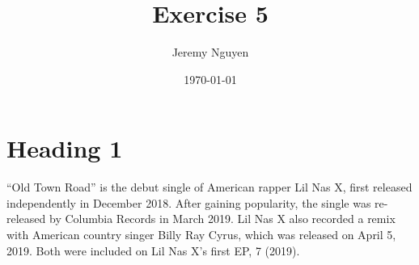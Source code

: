 \documentclass[11pt]{article}
\begin{document}
\title{Exercise 5}
\author{Jeremy Nguyen}
\date{\today}
\maketitle

\section{Heading 1}
``Old Town Road'' is the debut single of American rapper Lil Nas X, first
released independently in December 2018\cite{oldtownroad}. After gaining
popularity, the single was re-released by Columbia Records in March
2019\cite{trump2009trump}. Lil Nas X also recorded a remix with American
country singer Billy Ray Cyrus\cite{biden2007promises}, which was released on
April 5, 2019. Both were included on Lil Nas X's first EP, 7
(2019)\cite{obama2009remarks}.



\end{document}

